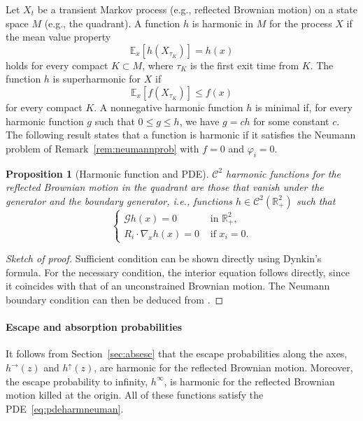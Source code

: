 \documentclass[11pt]{article}
\newtheorem{prop}[thm]{Proposition}
\theoremstyle{definition}
\newtheorem{deffr}[thm]{Definition}
\renewcommand{\leq}{\leqslant}
\begin{document}
Let $X_t$ be a transient Markov process (e.g., reflected Brownian motion) on a state space $M$ (e.g., the quadrant). %
A function $h$ is harmonic in $M$ for the process $X$ %
if the mean value property
$$
\mathbb{E}_x\left[h\left(X_{\tau_K}\right)\right]=h(x)
$$
holds for every compact $K \subset M$, where $\tau_K$ is the first exit time from $K$.
The function $h$ is superharmonic for $X$ if $$\mathbb{E}_x\left[f\left(X_{\tau_K}\right)\right] \leq f(x)$$ for every compact $K$.
A nonnegative harmonic function $h$ is minimal if, for every harmonic function $g$ such that $0 \leq g \leq h$, we have $g = c h$ for some constant $c$.
The following result states that a function is harmonic if it satisfies the Neumann problem of Remark~\ref{rem:neumannprob} with $f=0$ and $\varphi_i=0$.
\begin{prop}[Harmonic function and PDE]
$\mathcal{C}^2$ harmonic functions for the reflected Brownian motion in the quadrant are those that vanish under the generator and the boundary generator, i.e., functions $h \in \mathcal{C}^2\left( \mathbb{R}_{+}^2\right)$ such that
\begin{equation}
\begin{cases}\mathcal{G} h(x)=0 & \text { in } \mathbb{R}_{+}^2, \\ R_i \cdot \nabla_x h(x)=0 & \text { if } x_i=0.\end{cases}
\label{eq:pdeharmneuman}
\end{equation}
\end{prop}
\begin{proof}[Sketch of proof]
Sufficient condition can be shown directly using Dynkin's formula. For the necessary condition, the interior equation follows directly, since it coincides with that of an unconstrained Brownian motion. The Neumann boundary condition can then be deduced from \cite[Corollary~3.3]{andres_2009}. 
\end{proof}

\paragraph{Escape and absorption probabilities}
It follows from Section~\ref{sec:absesc} that the escape probabilities along the axes, $h^\rightarrow(z)$ and $h^\uparrow(z)$, are harmonic for the reflected Brownian motion. Moreover, the escape probability to infinity, $h^\infty$, is harmonic for the reflected Brownian motion killed at the origin. All of these functions satisfy the PDE~\eqref{eq:pdeharmneuman}.
\end{document}
